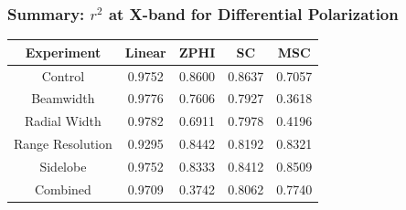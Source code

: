 \documentclass[red]{beamer}
\begin{document}
\begin{frame}
    \frametitle{Summary: $r^2$ at X-band for Differential Polarization}
    \begin{center}
        \begin{tabular}{| c | c | c | c | c |}
            \hline
            Experiment & Linear & ZPHI & SC & MSC \\
            \hline
            \hline
            Control & 0.9752 & 0.8600 & 0.8637 & 0.7057 \\
            Beamwidth & 0.9776 & 0.7606 & 0.7927 & 0.3618 \\
            Radial Width & 0.9782 & 0.6911 & 0.7978 & 0.4196 \\
            Range Resolution & 0.9295 & 0.8442 & 0.8192 & 0.8321 \\
            Sidelobe & 0.9752 & 0.8333 & 0.8412 & 0.8509 \\
            Combined & 0.9709 & 0.3742 & 0.8062 & 0.7740 \\
            \hline
        \end{tabular}
    \end{center}
\end{frame}
\end{document}
